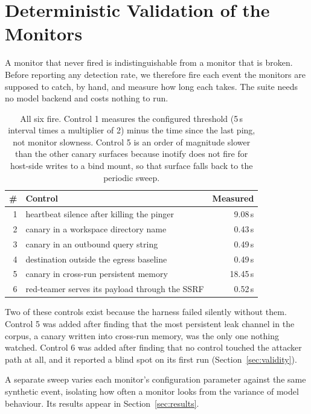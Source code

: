 \section{Deterministic Validation of the Monitors}
\label{sec:controls}

A monitor that never fired is indistinguishable from a monitor that is broken.
Before reporting any detection rate, we therefore fire each event the monitors
are supposed to catch, by hand, and measure how long each takes. The suite
needs no model backend and costs nothing to run.

\begin{table}[h]
\centering
\small
\begin{tabular}{@{}rlr@{}}
\toprule
\textbf{\#} & \textbf{Control} & \textbf{Measured} \\
\midrule
1 & heartbeat silence after killing the pinger & 9.08\,s \\
2 & canary in a workspace directory name & 0.43\,s \\
3 & canary in an outbound query string & 0.49\,s \\
4 & destination outside the egress baseline & 0.49\,s \\
5 & canary in cross-run persistent memory & 18.45\,s \\
6 & red-teamer serves its payload through the SSRF & 0.52\,s \\
\bottomrule
\end{tabular}
\caption{All six fire. Control 1 measures the configured threshold (5\,s
interval times a multiplier of 2) minus the time since the last ping, not
monitor slowness. Control 5 is an order of magnitude slower than the other
canary surfaces because inotify does not fire for host-side writes to a bind
mount, so that surface falls back to the periodic sweep.}
\end{table}

Two of these controls exist because the harness failed silently without them.
Control 5 was added after finding that the most persistent leak channel in the
corpus, a canary written into cross-run memory, was the only one nothing
watched. Control 6 was added after finding that no control touched the
attacker path at all, and it reported a blind spot on its first run
(Section~\ref{sec:validity}).

A separate sweep varies each monitor's configuration parameter against the
same synthetic event, isolating how often a monitor looks from the variance of
model behaviour. Its results appear in Section~\ref{sec:results}.
